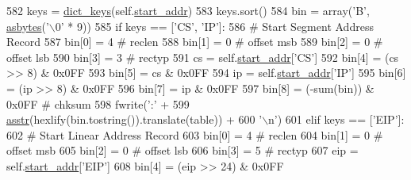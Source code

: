 \begin{DoxyCode}
582             keys = \hyperlink{namespacesoftware_1_1chipwhisperer_1_1capture_1_1utils_1_1IntelHex_a675ad269e4a9a3ee5a5b4b413d0fb690}{dict\_keys}(self.\hyperlink{classsoftware_1_1chipwhisperer_1_1capture_1_1utils_1_1IntelHex_1_1IntelHex_a5da95579a9d232f27b10682ef2422316}{start\_addr})
583             keys.sort()
584             bin = array(\textcolor{stringliteral}{'B'}, \hyperlink{namespacesoftware_1_1chipwhisperer_1_1capture_1_1utils_1_1IntelHex_a7f086f0677c4876409244a91e386b8cc}{asbytes}(\textcolor{stringliteral}{'\(\backslash\)0'} * 9))
585             \textcolor{keywordflow}{if} keys == [\textcolor{stringliteral}{'CS'}, \textcolor{stringliteral}{'IP'}]:
586                 \textcolor{comment}{# Start Segment Address Record}
587                 bin[0] = 4  \textcolor{comment}{# reclen}
588                 bin[1] = 0  \textcolor{comment}{# offset msb}
589                 bin[2] = 0  \textcolor{comment}{# offset lsb}
590                 bin[3] = 3  \textcolor{comment}{# rectyp}
591                 cs = self.\hyperlink{classsoftware_1_1chipwhisperer_1_1capture_1_1utils_1_1IntelHex_1_1IntelHex_a5da95579a9d232f27b10682ef2422316}{start\_addr}[\textcolor{stringliteral}{'CS'}]
592                 bin[4] = (cs >> 8) & 0x0FF
593                 bin[5] = cs & 0x0FF
594                 ip = self.\hyperlink{classsoftware_1_1chipwhisperer_1_1capture_1_1utils_1_1IntelHex_1_1IntelHex_a5da95579a9d232f27b10682ef2422316}{start\_addr}[\textcolor{stringliteral}{'IP'}]
595                 bin[6] = (ip >> 8) & 0x0FF
596                 bin[7] = ip & 0x0FF
597                 bin[8] = (-sum(bin)) & 0x0FF  \textcolor{comment}{# chksum}
598                 fwrite(\textcolor{stringliteral}{':'} +
599                        \hyperlink{namespacesoftware_1_1chipwhisperer_1_1capture_1_1utils_1_1IntelHex_a32eb6deeafe6dba1f76d94543cff7528}{asstr}(hexlify(bin.tostring()).translate(table)) +
600                        \textcolor{stringliteral}{'\(\backslash\)n'})
601             \textcolor{keywordflow}{elif} keys == [\textcolor{stringliteral}{'EIP'}]:
602                 \textcolor{comment}{# Start Linear Address Record}
603                 bin[0] = 4  \textcolor{comment}{# reclen}
604                 bin[1] = 0  \textcolor{comment}{# offset msb}
605                 bin[2] = 0  \textcolor{comment}{# offset lsb}
606                 bin[3] = 5  \textcolor{comment}{# rectyp}
607                 eip = self.\hyperlink{classsoftware_1_1chipwhisperer_1_1capture_1_1utils_1_1IntelHex_1_1IntelHex_a5da95579a9d232f27b10682ef2422316}{start\_addr}[\textcolor{stringliteral}{'EIP'}]
608                 bin[4] = (eip >> 24) & 0x0FF

\end{DoxyCode}
